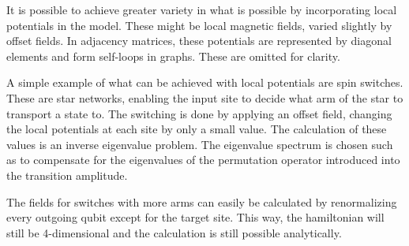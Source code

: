 
\begin{center}
\end{center}

\noindent It is possible to achieve greater variety in what is possible by incorporating local potentials in the model. These might be local magnetic fields, varied slightly by offset fields. In adjacency matrices, these potentials are represented by diagonal elements and form self-loops in graphs. These are omitted for clarity.\par
A simple example of what can be achieved with local potentials are spin switches\cite{Yung2011}. These are star networks, enabling the input site to decide what arm of the star to transport a state to. The switching is done by applying an offset field, changing the local potentials at each site by only a small value. The calculation of these values is an inverse eigenvalue problem. The eigenvalue spectrum is chosen such as to compensate for the eigenvalues of the permutation operator introduced into the transition amplitude.\par
The fields for switches with more arms can easily be calculated by renormalizing every outgoing qubit except for the target site\cite{Yung2011}. This way, the hamiltonian will still be 4-dimensional and the calculation is still possible analytically.

